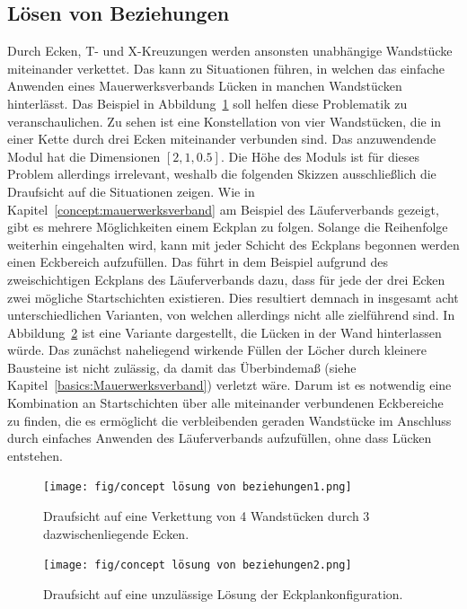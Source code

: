 \subsection{Lösen von Beziehungen}\label{concept:solving_beziehungen}
Durch Ecken, T- und X-Kreuzungen werden ansonsten unabhängige Wandstücke miteinander verkettet.
Das kann zu Situationen führen, in welchen das einfache Anwenden eines Mauerwerksverbands Lücken in manchen Wandstücken hinterlässt.
Das Beispiel in Abbildung~\ref{fig:concept:loesen_von_beziehungen1} soll helfen diese Problematik zu veranschaulichen.
Zu sehen ist eine Konstellation von vier Wandstücken, die in einer Kette durch drei Ecken miteinander verbunden sind.
Das anzuwendende Modul hat die Dimensionen \([2, 1, 0.5]\). 
Die Höhe des Moduls ist für dieses Problem allerdings irrelevant, weshalb die folgenden Skizzen ausschließlich die Draufsicht auf die Situationen zeigen.
Wie in Kapitel~\ref{concept:mauerwerksverband} am Beispiel des Läuferverbands gezeigt, gibt es mehrere Möglichkeiten einem Eckplan zu folgen.
Solange die Reihenfolge weiterhin eingehalten wird, kann mit jeder Schicht des Eckplans begonnen werden einen Eckbereich aufzufüllen.
Das führt in dem Beispiel aufgrund des zweischichtigen Eckplans des Läuferverbands dazu, dass für jede der drei Ecken zwei mögliche Startschichten existieren.
Dies resultiert demnach in insgesamt acht unterschiedlichen Varianten, von welchen allerdings nicht alle zielführend sind.
In Abbildung~\ref{fig:concept:loesen_von_beziehungen2} ist eine Variante dargestellt, die Lücken in der Wand hinterlassen würde.
Das zunächst naheliegend wirkende Füllen der Löcher durch kleinere Bausteine ist nicht zulässig, da damit das Überbindemaß (siehe Kapitel~\ref{basics:Mauerwerksverband}) verletzt wäre.
Darum ist es notwendig eine Kombination an Startschichten über alle miteinander verbundenen Eckbereiche zu finden, die es ermöglicht die verbleibenden geraden Wandstücke im Anschluss durch einfaches Anwenden des Läuferverbands aufzufüllen, ohne dass Lücken entstehen.

\begin{figure}[]
    \centering
    \texttt{[image: fig/concept lösung von beziehungen1.png]}
    \caption{Draufsicht auf eine Verkettung von 4 Wandstücken durch 3 dazwischenliegende Ecken.}\label{fig:concept:loesen_von_beziehungen1}
\end{figure}

\begin{figure}[]
    \centering
    \texttt{[image: fig/concept lösung von beziehungen2.png]}
    \caption{Draufsicht auf eine unzulässige Lösung der Eckplankonfiguration.}\label{fig:concept:loesen_von_beziehungen2}
\end{figure}


